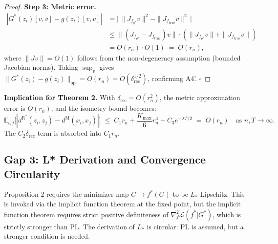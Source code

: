 \documentclass[11pt]{article}
\newcommand{\dR}{d^{\mathrm{R}}}
\newcommand{\dM}{d^{\mathrm{M}}}
\newcommand{\E}{\mathbb{E}}
\newcommand{\Kmax}{K_{\max}}
\begin{document}
\begin{bridgebox}
\begin{proof}
\textbf{Step 3: Metric error.}
\begin{align*}
    |G^*(z_i)[v,v] - g(z_i)[v,v]|
    &= \bigl|\,\|J_{f_{\theta^*}} v\|^2 - \|J_{f_{\mathrm{true}}} v\|^2\,\bigr| \\
    &\le \|(J_{f_{\theta^*}} - J_{f_{\mathrm{true}}}) v\| \cdot
    (\|J_{f_{\theta^*}} v\| + \|J_{f_{\mathrm{true}}} v\|) \\
    &= O(r_n) \cdot O(1) \;=\; O(r_n),
\end{align*}
where $\|J v\| = O(1)$ follows from the non-degeneracy assumption (bounded
Jacobian norms). Taking $\sup_v$ gives $\|G^*(z_i) - g(z_i)\|_{\mathrm{op}}
= O(r_n) = O(\delta_{\mathrm{rec}}^{1/2})$, confirming A4'. $\square$
\end{proof}

\textbf{Implication for Theorem 2.}
With $\delta_{\mathrm{rec}} = O(r_n^2)$, the metric approximation error is
$O(r_n)$, and the isometry bound becomes:
\[
    \E_{i,j}\bigl[|\dR^*(z_i,z_j) - \dM(x_i,x_j)|\bigr]
    \;\le\; C_1 r_n + \frac{\Kmax}{6} r_n^3 + C_3 e^{-\lambda T/2}
    \;=\; O(r_n) \quad \text{as } n,T \to \infty.
\]
The $C_2 \delta_{\mathrm{rec}}$ term is absorbed into $C_1 r_n$.
\end{bridgebox}

\subsection{Gap 3: L* Derivation and Convergence Circularity}

\begin{gapbox}
Proposition 2 requires the minimizer map $G \mapsto f^*(G)$ to be $L_*$-Lipschitz.
This is invoked via the implicit function theorem at the fixed point, but the
implicit function theorem requires strict positive definiteness of $\nabla^2_f
\mathcal{L}(f^*|G^*)$, which is strictly stronger than PL. The derivation of
$L_*$ is circular: PL is assumed, but a stronger condition is needed.
\end{gapbox}
\end{document}
